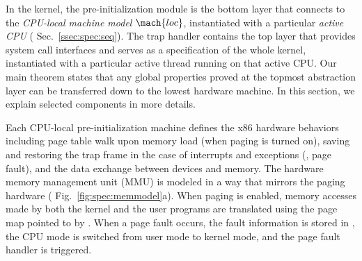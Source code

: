 In the \mCTOSbase{} kernel, the pre-initialization module is the
bottom layer that connects to the \emph{CPU-local machine model}
$\mach{loc}$, instantiated with a particular \emph{active CPU} (\cf
Sec.~\ref{ssec:spec:seq}).  The trap handler contains the top layer
that provides system call interfaces and serves as a specification of
the whole kernel, instantiated with a particular active thread running
on that active CPU.  Our main theorem states that any global
properties proved at the topmost abstraction layer can be transferred
down to the lowest hardware machine.  In this section, we explain
selected components in more details.


Each CPU-local pre-initialization machine defines the x86 hardware
behaviors including page table walk upon memory load (when paging is
turned on), saving and restoring the trap frame in the case of
interrupts and exceptions (\eg, page fault), and the data exchange
between devices and memory. The hardware memory management unit (MMU)
is modeled in a way that mirrors the paging hardware (\cf
Fig.~\ref{fig:spec:memmodel}a). When paging is enabled, memory
accesses made by both the kernel and the user programs are translated
using the page map pointed to by .  When a page fault
occurs, the fault information is stored in , the CPU mode is
switched from user mode to kernel mode, and the page fault handler is
triggered.





